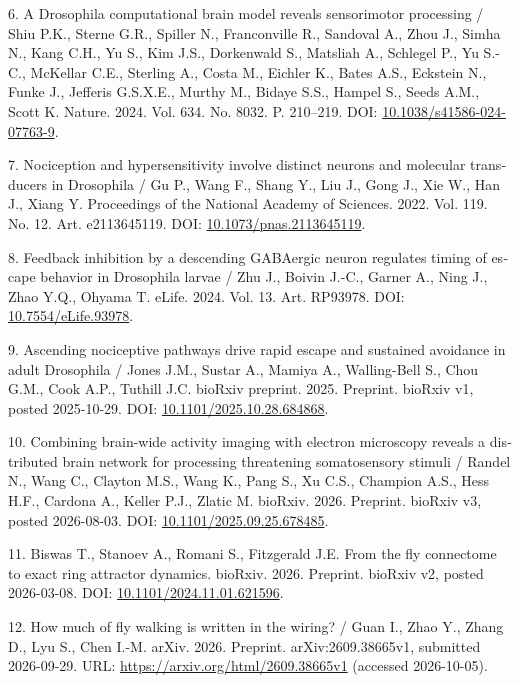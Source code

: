 \documentclass[12pt,a4paper]{article}
\begin{document}
\noindent\foreignlanguage{english}{6. A Drosophila computational brain model reveals sensorimotor processing / Shiu P.K., Sterne G.R., Spiller N., Franconville R., Sandoval A., Zhou J., Simha N., Kang C.H., Yu S., Kim J.S., Dorkenwald S., Matsliah A., Schlegel P., Yu S.-C., McKellar C.E., Sterling A., Costa M., Eichler K., Bates A.S., Eckstein N., Funke J., Jefferis G.S.X.E., Murthy M., Bidaye S.S., Hampel S., Seeds A.M., Scott K. Nature. 2024. Vol. 634. No. 8032. P. 210–219. DOI: \url{10.1038/s41586-024-07763-9}.}\par
\noindent\foreignlanguage{english}{7. Nociception and hypersensitivity involve distinct neurons and molecular transducers in Drosophila / Gu P., Wang F., Shang Y., Liu J., Gong J., Xie W., Han J., Xiang Y. Proceedings of the National Academy of Sciences. 2022. Vol. 119. No. 12. Art. e2113645119. DOI: \url{10.1073/pnas.2113645119}.}\par
\noindent\foreignlanguage{english}{8. Feedback inhibition by a descending GABAergic neuron regulates timing of escape behavior in Drosophila larvae / Zhu J., Boivin J.-C., Garner A., Ning J., Zhao Y.Q., Ohyama T. eLife. 2024. Vol. 13. Art. RP93978. DOI: \url{10.7554/eLife.93978}.}\par
\noindent\foreignlanguage{english}{9. Ascending nociceptive pathways drive rapid escape and sustained avoidance in adult Drosophila / Jones J.M., Sustar A., Mamiya A., Walling-Bell S., Chou G.M., Cook A.P., Tuthill J.C. bioRxiv preprint. 2025. Preprint. bioRxiv v1, posted 2025-10-29. DOI: \url{10.1101/2025.10.28.684868}.}\par
\noindent\foreignlanguage{english}{10. Combining brain-wide activity imaging with electron microscopy reveals a distributed brain network for processing threatening somatosensory stimuli / Randel N., Wang C., Clayton M.S., Wang K., Pang S., Xu C.S., Champion A.S., Hess H.F., Cardona A., Keller P.J., Zlatic M. bioRxiv. 2026. Preprint. bioRxiv v3, posted 2026-08-03. DOI: \url{10.1101/2025.09.25.678485}.}\par
\noindent\foreignlanguage{english}{11. Biswas T., Stanoev A., Romani S., Fitzgerald J.E. From the fly connectome to exact ring attractor dynamics. bioRxiv. 2026. Preprint. bioRxiv v2, posted 2026-03-08. DOI: \url{10.1101/2024.11.01.621596}.}\par
\noindent\foreignlanguage{english}{12. How much of fly walking is written in the wiring? / Guan I., Zhao Y., Zhang D., Lyu S., Chen I.-M. arXiv. 2026. Preprint. arXiv:2609.38665v1, submitted 2026-09-29. URL: \url{https://arxiv.org/html/2609.38665v1} (accessed 2026-10-05).}\par
\end{document}
